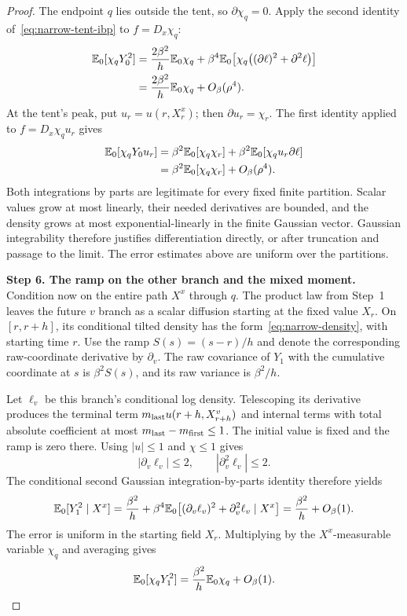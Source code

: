 \begin{proof}
The endpoint $q$ lies outside the tent, so $\partial\chi_q=0$.
Apply the second identity of~\eqref{eq:narrow-tent-ibp} to
$f=D_x\chi_q$:
\begin{align}
 \mathbb E_0[\chi_qY_0^2]
 &=\frac{2\beta^2}{h}\mathbb E_0\chi_q
   +\beta^4\mathbb E_0\!\left[
         \chi_q\bigl((\partial\ell)^2+\partial^2\ell\bigr)\right]
 \notag\\
 &=\frac{2\beta^2}{h}\mathbb E_0\chi_q+O_\beta(\rho^4).
 \label{eq:narrow-Y0-square}
\end{align}
At the tent's peak, put $u_r=u(r,X_r^x)$; then
$\partial u_r=\chi_r$. The first identity applied to
$f=D_x\chi_qu_r$ gives
\begin{align}
 \mathbb E_0[\chi_qY_0u_r]
 &=\beta^2\mathbb E_0[\chi_q\chi_r]
       +\beta^2\mathbb E_0[\chi_qu_r\partial\ell]
 \notag\\
 &=\beta^2\mathbb E_0[\chi_q\chi_r]+O_\beta(\rho^4).
 \label{eq:narrow-Y0-linear}
\end{align}
Both integrations by parts are legitimate for every fixed finite
partition. Scalar values grow at most linearly, their needed
derivatives are bounded, and the density grows at most
exponential-linearly in the finite Gaussian vector. Gaussian
integrability therefore justifies differentiation directly, or
after truncation and passage to the limit. The error estimates
above are uniform over the partitions.

\par\medskip\noindent\textbf{Step 6. The ramp on the other branch and the mixed moment.}\enspace
Condition now on the entire path $X^x$ through $q$. The product law
from Step~1 leaves the future $v$ branch as a scalar diffusion
starting at the fixed value $X_r$. On $[r,r+h]$, its conditional
tilted density has the form~\eqref{eq:narrow-density}, with starting
time $r$. Use the ramp $S(s)=(s-r)/h$ and denote the corresponding
raw-coordinate derivative by $\partial_v$. The raw covariance of
$Y_1$ with the cumulative coordinate at $s$ is $\beta^2S(s)$,
and its raw variance is $\beta^2/h$.

Let $\ell_v$ be this branch's conditional log density. Telescoping
its derivative produces the terminal term
$m_{\rm last}u(r+h,X^v_{r+h})$ and internal terms with total
absolute coefficient at most
$m_{\rm last}-m_{\rm first}\le1$. The initial value is fixed and
the ramp is zero there. Using $|u|\le1$ and $\chi\le1$ gives
\[
 |\partial_v\ell_v|\le2,\qquad
 |\partial_v^2\ell_v|\le2.
\]
The conditional second Gaussian integration-by-parts identity
therefore yields
\begin{equation}\label{eq:narrow-Y1-square}
 \mathbb E_0[Y_1^2\mid X^x]
 =\frac{\beta^2}{h}
  +\beta^4\mathbb E_0\!\left[
       (\partial_v\ell_v)^2+\partial_v^2\ell_v\mid X^x\right]
 =\frac{\beta^2}{h}+O_\beta(1).
\end{equation}
The error is uniform in the starting field $X_r$. Multiplying by
the $X^x$-measurable variable $\chi_q$ and averaging gives
\[
 \mathbb E_0[\chi_qY_1^2]
 =\frac{\beta^2}{h}\mathbb E_0\chi_q+O_\beta(1).
\]


\end{proof}
